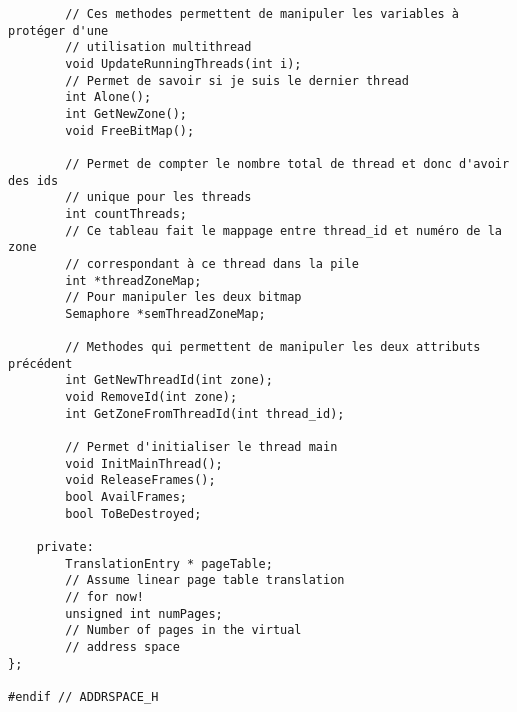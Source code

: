 \documentclass[a4paper,10pt]{article}
\begin{document}
\begin{lstlisting}
        // Ces methodes permettent de manipuler les variables à protéger d'une
        // utilisation multithread
        void UpdateRunningThreads(int i);
        // Permet de savoir si je suis le dernier thread
        int Alone();
        int GetNewZone();
        void FreeBitMap();

        // Permet de compter le nombre total de thread et donc d'avoir des ids
        // unique pour les threads
        int countThreads;
        // Ce tableau fait le mappage entre thread_id et numéro de la zone
        // correspondant à ce thread dans la pile
        int *threadZoneMap;
        // Pour manipuler les deux bitmap
        Semaphore *semThreadZoneMap;

        // Methodes qui permettent de manipuler les deux attributs précédent
        int GetNewThreadId(int zone);
        void RemoveId(int zone);
        int GetZoneFromThreadId(int thread_id);

        // Permet d'initialiser le thread main
        void InitMainThread();
        void ReleaseFrames();
        bool AvailFrames;
        bool ToBeDestroyed;

    private:
        TranslationEntry * pageTable;
        // Assume linear page table translation
        // for now!
        unsigned int numPages;
        // Number of pages in the virtual
        // address space
};

#endif // ADDRSPACE_H
\end{lstlisting}
\end{document}

